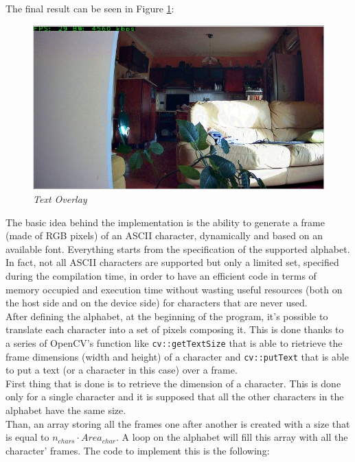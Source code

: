 \documentclass[paper=a4, fontsize=10pt]{scrartcl}	%
\begin{document}
	The final result can be seen in Figure \ref{fig:demo_chars}:

	\begin{figure}[H]
		\centering
		\includegraphics[width=0.9\linewidth]{images/chars_ok.png}
		\caption{\textit{Text Overlay}}
		\label{fig:demo_chars}
	\end{figure}

	The basic idea behind the implementation is the ability to generate a frame (made of RGB pixels) of an ASCII character, dynamically and based on an available font. Everything starts from the specification of the supported alphabet. In fact, not all ASCII characters are supported but only a limited set, specified during the compilation time, in order to have an efficient code in terms of memory occupied and execution time without wasting useful resources (both on the host side and on the device side) for characters that are never used.\\

	After defining the alphabet, at the beginning of the program, it's possible to translate each character into a set of pixels composing it. This is done thanks to a series of OpenCV's function like \texttt{cv::getTextSize} that is able to rietrieve the frame dimensions (width and height) of a character and \texttt{cv::putText} that is able to put a text (or a character in this case) over a frame.\\

	First thing that is done is to retrieve the dimension of a character. This is done only for a single character and it is supposed that all the other characters in the alphabet have the same size.\\

	Than, an array storing all the frames one after another is created with a size that is equal to $ n_{chars} \cdot Area_{char} $. A loop on the alphabet will fill this array with all the character' frames. The code to implement this is the following:
\end{document}
